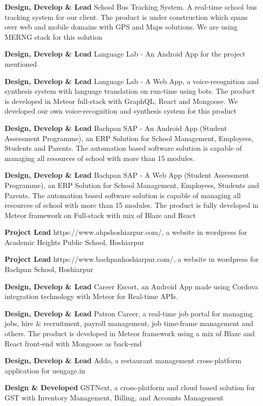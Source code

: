 \documentclass[margin,line]{res}
\begin{document}
\begin{resume}
\textbf{Design, Develop \& Lead} School Bus Tracking System. A real-time school bus tracking system for our client. The product is under construction which spans over web and mobile domains with GPS and Maps solutions. We are using MERNG stack for this solution

\textbf{Design, Develop \& Lead} Language Lab - An Android App for the project mentioned

\textbf{Design, Develop \& Lead} Language Lab - A Web App, a voice-recognition and synthesis system with language translation on run-time using bots. The product is developed in Meteor full-stack with GraphQL, React and Mongoose. We developed our own voice-recognition and synthesis system for this product

\textbf{Design, Develop \& Lead} Bachpan SAP - An Android App (Student Assessment Programme), an ERP Solution for School Management, Employees, Students and Parents. The automation based software solution is capable of managing all resources of school with more than 15 modules.

\textbf{Design, Develop \& Lead} Bachpan SAP - A Web App (Student Assessment Programme), an ERP Solution for School Management, Employees, Students and Parents. The automation based software solution is capable of managing all resources of school with more than 15 modules. The product is fully developed in Meteor framework on Full-stack with mix of Blaze and React

\textbf{Project Lead} https://www.ahpshoshiarpur.com/, a website in wordpress for Academic Heights Public School, Hoshiarpur

\textbf{Project Lead} https://www.bachpanhoshiarpur.com/, a website in wordpress for Bachpan School, Hoshiarpur

\textbf{Design, Develop \& Lead} Career Escort, an Android App made using Cordova integration technology with Meteor for Real-time APIs.

\textbf{Design, Develop \& Lead} Patron Career, a real-time job portal for managing jobs, hire \& recruitment, payroll management, job time-frame management and others. The product is developed in Meteor framework using a mix of Blaze and React front-end with Mongoose as back-end

\textbf{Design, Develop \& Lead} Addo, a restaurant management cross-platform application for uengage.in 

\textbf{Design \& Developed} GSTNext, a cross-platform and cloud based solution for GST with Inventory Management, Billing, and Accounts Management


\end{resume}
\end{document}
